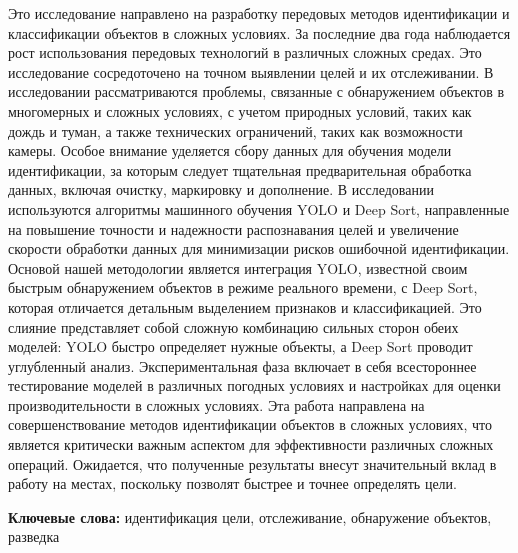 Это исследование направлено на разработку передовых методов
идентификации и классификации объектов в сложных условиях. За последние
два года наблюдается рост использования передовых технологий в различных
сложных средах. Это исследование сосредоточено на точном выявлении целей
и их отслеживании. В исследовании рассматриваются проблемы, связанные с
обнаружением объектов в многомерных и сложных условиях, с учетом
природных условий, таких как дождь и туман, а также технических
ограничений, таких как возможности камеры. Особое внимание уделяется
сбору данных для обучения модели идентификации, за которым следует
тщательная предварительная обработка данных, включая очистку, маркировку
и дополнение. В исследовании используются алгоритмы машинного обучения
YOLO и Deep Sort, направленные на повышение точности и надежности
распознавания целей и увеличение скорости обработки данных для
минимизации рисков ошибочной идентификации. Основой нашей методологии
является интеграция YOLO, известной своим быстрым обнаружением объектов
в режиме реального времени, с Deep Sort, которая отличается детальным
выделением признаков и классификацией. Это слияние представляет собой
сложную комбинацию сильных сторон обеих моделей: YOLO быстро определяет
нужные объекты, а Deep Sort проводит углубленный анализ.
Экспериментальная фаза включает в себя всестороннее тестирование моделей
в различных погодных условиях и настройках для оценки производительности
в сложных условиях. Эта работа направлена на совершенствование методов
идентификации объектов в сложных условиях, что является критически
важным аспектом для эффективности различных сложных операций. Ожидается,
что полученные результаты внесут значительный вклад в работу на местах,
поскольку позволят быстрее и точнее определять цели.

{\bfseries Ключевые слова:} идентификация цели, отслеживание, обнаружение
объектов, разведка

